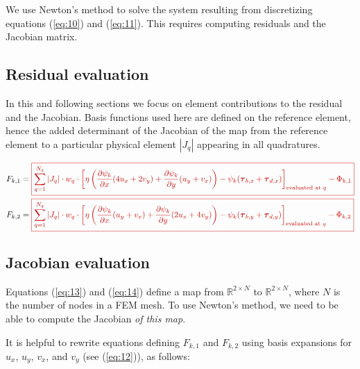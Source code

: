 \documentclass{amsart}
\newcommand{\T}{\boldsymbol{\tau}}
\newcommand{\diff}[2]{\ensuremath{\frac{\partial #1}{\partial #2}}}
\newcommand{\sumQ}{\ensuremath{\sum_{q = 1}^{N_q}}}
\newcommand{\basalshearstress}[1]{\T_{b#1}}
\newcommand{\taubx}{\basalshearstress{,x}}
\newcommand{\tauby}{\basalshearstress{,y}}
\newcommand{\drivingstress}[1]{\T_{d#1}}
\newcommand{\taudx}{\drivingstress{,x}}
\newcommand{\taudy}{\drivingstress{,y}}
\newcommand{\highlight}[1]{{\color{red!80!black} \fbox{$ \displaystyle #1 $} }}
\newcommand{\R}{\mathbb{R}}
\begin{document}
We use Newton's method to solve the system resulting from discretizing equations (\ref{eq:10}) and (\ref{eq:11}). This requires computing residuals and the Jacobian matrix.

\subsection{Residual evaluation}
\label{sec-3-1}

In this and following sections we focus on element contributions to the residual and the Jacobian. Basis functions used here are defined on the reference element, hence the added determinant of the Jacobian of the map from the reference element to a particular physical element $|J_q|$ appearing in all quadratures.

\begin{align}
  \label{eq:13}
  F_{k,1} & = \highlight{ \sumQ |J_q| \cdot w_q\cdot \left[ \eta \left( \diff{\psi_k}{x} (\Mux) + \diff{\psi_k}{y} (\Muy) \right) - \psi_k (\taubx + \taudx) \right]_{\text{evaluated at } q} - \Phi_{k,1} }\\
  \label{eq:14}
  F_{k,2} & = \highlight{ \sumQ |J_q| \cdot w_q\cdot \left[ \eta \left( \diff{\psi_k}{x} (\Mvx) + \diff{\psi_k}{y} (\Mvy) \right) - \psi_k (\tauby + \taudy) \right]_{\text{evaluated at } q} - \Phi_{k,2}}
\end{align}


\subsection{Jacobian evaluation}
\label{sec-3-2}

Equations (\ref{eq:13}) and (\ref{eq:14}) define a map from $\R^{2\times N}$ to $\R^{2\times N}$, where $N$ is the number of nodes in a FEM mesh. To use Newton's method, we need to be able to compute the Jacobian \emph{of this map}.

It is helpful to rewrite equations defining $F_{k,1}$ and $F_{k,2}$ using basis expansions for $u_x$, $u_y$, $v_x$, and $v_y$ (see (\ref{eq:12})), as follows:
\end{document}
